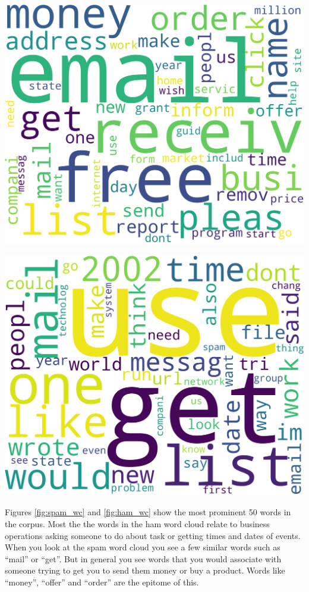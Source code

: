 \documentclass[12pt]{article}
\begin{document}
\begin{multicols}{2}
            \begin{minipage}{0.4\columnwidth}
                \includegraphics[width=\textwidth]{figures/spam_wc}
                \label{fig:spam_wc}
            \end{minipage}
            \begin{minipage}{0.4\columnwidth}
                \includegraphics[width=\textwidth]{figures/ham_wc}
                \label{fig:ham_wc}
             \end{minipage}

             Figures \ref{fig:spam_wc} and \ref{fig:ham_wc} show
             the most prominent 50 words in the corpus. Most the the words in the
             ham word cloud relate to business operations asking someone to do about
             task or getting times and dates of events. When you look at the spam
             word cloud you see a few similar words such as ``mail'' or ``get''.
             But in general you see words that you would associate with someone trying
             to get you to send them money or buy a product. Words like ``money'',
             ``offer'' and ``order'' are the epitome of this.


\end{multicols}
\end{document}
